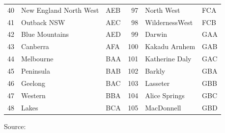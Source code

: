 \documentclass[a4paper,11pt]{article}
\theoremstyle{definition}
\begin{document}
\begin{table}[H]
\begin{tabular}{r l l|r l l}
		40 &New England North West &AEB &97& North West& FCA\\
		41 &Outback NSW& AEC &98& WildernessWest& FCB\\
		42 &Blue Mountains& AED & 99 &Darwin &GAA\\
		43 &Canberra &AFA&100 &Kakadu Arnhem& GAB\\
		44 &Melbourne& BAA & 101& Katherine Daly& GAC\\
		45 &Peninsula &BAB&102& Barkly &GBA\\
		46 &Geelong& BAC& 103& Lasseter& GBB\\
		47 &Western& BBA& 104& Alice Springs &GBC\\
		48&Lakes&BCA & 105 &MacDonnell &GBD\\
		\bottomrule
	\end{tabular}
	\begin{flushleft}
		\begin{footnotesize}
			Source: \cite{wickramasuriya2019, difonzo2022a}
		\end{footnotesize}
	\end{flushleft}
\end{table}
\end{document}

